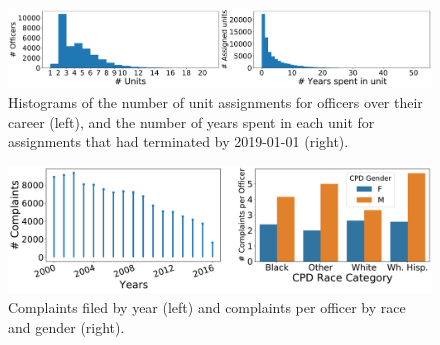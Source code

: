 \begin{figure}[t!] 
	\includegraphics[width=\textwidth]{figs/units_officers.pdf} 
	\caption{Histograms of the number of unit assignments for
officers over their career (left), and the number of years spent in each unit for assignments that had terminated by 2019-01-01 (right).}
\label{fig:units}
\end{figure}


\begin{figure}[t!] 
	\includegraphics[width=\textwidth]{figs/complaints_years_race_gender.pdf} 
	\caption{Complaints filed by year (left) and complaints per officer by race and gender (right).} \label{fig:complaints}
\label{fig:units}
\end{figure}

